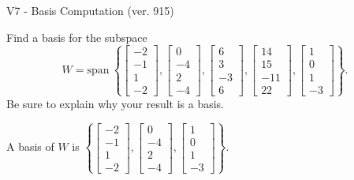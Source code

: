 \begin{exercise}
  \begin{exerciseTitle}V7 - Basis Computation (ver. 915)\end{exerciseTitle}
  \begin{exerciseStatement}
    Find a basis for the subspace 
\[W=\mathrm{span}\ \left\{\left[\begin{array}{r}
-2 \\
-1 \\
1 \\
-2
\end{array}\right] , \left[\begin{array}{r}
0 \\
-4 \\
2 \\
-4
\end{array}\right] , \left[\begin{array}{r}
6 \\
3 \\
-3 \\
6
\end{array}\right] , \left[\begin{array}{r}
14 \\
15 \\
-11 \\
22
\end{array}\right] , \left[\begin{array}{r}
1 \\
0 \\
1 \\
-3
\end{array}\right]\right\}.\]
 Be sure to explain why your result is a basis.


  \end{exerciseStatement}
  \begin{exerciseAnswer}
   A basis of \(W\) is  \(\left\{\left[\begin{array}{r}
-2 \\
-1 \\
1 \\
-2
\end{array}\right] , \left[\begin{array}{r}
0 \\
-4 \\
2 \\
-4
\end{array}\right] , \left[\begin{array}{r}
1 \\
0 \\
1 \\
-3
\end{array}\right]\right\}\).
  


  \end{exerciseAnswer}
\end{exercise}
